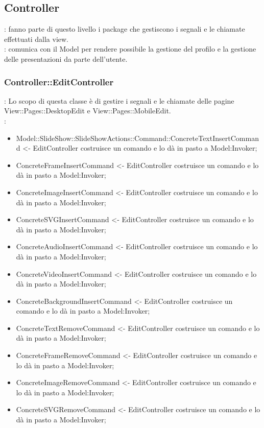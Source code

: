 \subsection{Controller}{
	\textbf{\tipo}: fanno parte di questo livello i package che gestiscono i segnali e le chiamate effettuati dalla view.\\
	\textbf{\relaz}: comunica con il Model per rendere possibile la gestione del profilo e la gestione delle presentazioni da parte dell'utente.\\
	
	\subsubsection{Controller::EditController}{
		\textbf{\tipo}: Lo scopo di questa classe è di gestire i segnali e le chiamate delle pagine View::Pages::DesktopEdit e View::Pages::MobileEdit.\\	
		\textbf{\relaz}:
		\begin{itemize}
			\item Model::SlideShow::SlideShowActions::Command::ConcreteTextInsertCommand <- EditController costruisce un comando e lo dà in pasto a Model:Invoker;
			\item ConcreteFrameInsertCommand <- EditController costruisce un comando e lo dà in pasto a Model:Invoker;
			\item ConcreteImageInsertCommand <- EditController costruisce un comando e lo dà in pasto a Model:Invoker;
			\item ConcreteSVGInsertCommand <- EditController costruisce un comando e lo dà in pasto a Model:Invoker;
			\item ConcreteAudioInsertCommand <- EditController costruisce un comando e lo dà in pasto a Model:Invoker;
			\item ConcreteVideoInsertCommand <- EditController costruisce un comando e lo dà in pasto a Model:Invoker;
			\item ConcreteBackgroundInsertCommand <- EditController costruisce un comando e lo dà in pasto a Model:Invoker;
			\item ConcreteTextRemoveCommand <- EditController costruisce un comando e lo dà in pasto a Model:Invoker;
			\item ConcreteFrameRemoveCommand <- EditController costruisce un comando e lo dà in pasto a Model:Invoker;
			\item ConcreteImageRemoveCommand <- EditController costruisce un comando e lo dà in pasto a Model:Invoker;
			\item ConcreteSVGRemoveCommand <- EditController costruisce un comando e lo dà in pasto a Model:Invoker;

\end{itemize}}}
